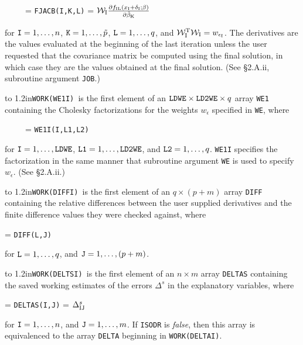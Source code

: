 
\aligntobox \ \ \ \ \ = {\tt FJACB(I,K,L)} = ${\cal W}_{\rm I}{{\partial
f_{\rm IL}(x_{\rm I}+\delta_{\rm
I};\beta)}\over{\partial\tilde{\beta}_{\rm K}}}$ 

\aligntobox for ${\tt I} = 1,\ldots,n$, ${\tt K} = 1,\ldots,\tilde{p}$, ${\tt L} = 1,\ldots,q$, and ${\cal W}_{\rm I}^{\rm T}{\cal W}_{\rm I} =
w_{\epsilon_{\rm I}}$. The derivatives are the values evaluated at the beginning of the last iteration unless the user requested that the covariance matrix be computed using the final solution, in which case they are the values obtained at the final solution. (See \S 2.A.ii, subroutine argument {\tt JOB}.)
\bigskip

\hangindent\wd\mybox{}\noindent\hbox to
1.2in{\hfill\tt WORK(WE1I) }is the first element of an ${\tt LDWE}\times {\tt LD2WE}\times q$ array {\tt WE1} containing the Cholesky factorizations for the weights $w_\epsilon$ specified in {\tt WE}, where


\aligntobox\ \ \ \ \ = {\tt WE1I(I,L1,L2)}

\aligntobox for ${\tt I} = 1,\ldots,{\tt LDWE}$, ${\tt L1} = 1,\ldots,{\tt LD2WE}$, and ${\tt L2} = 1,\ldots,q$. {\tt WE1I} specifies the factorization in the same manner that subroutine argument {\tt WE} is used to specify $w_\epsilon$. (See \S 2.A.ii.)
\bigskip

\hangindent\wd\mybox{}\noindent\hbox to
1.2in{\hfill\tt WORK(DIFFI) }is the first element of an $q \times (p + m)$ array {\tt DIFF} containing the relative differences between the user supplied derivatives and the finite difference values they were checked against, where

 = {\tt DIFF(L,J)}

\aligntobox for ${\tt L} = 1,\ldots,q$, and ${\tt J} = 1,\ldots,(p + m)$. 
\bigskip

\hangindent\wd\mybox{}\noindent\hbox to
1.2in{\hfill\tt WORK(DELTSI) }is the first element of an $n \times m$ array {\tt DELTAS} containing the saved working estimates of the errors $\Delta^s$ in the explanatory variables, where

 = {\tt DELTAS(I,J)} = $\Delta^s_{\rm
IJ}$ 

\aligntobox for ${\tt I} = 1,\ldots,n$, and ${\tt J} = 1,\ldots,m$. If {\tt ISODR} is {\it false\/}, then this array is equivalenced to the array {\tt DELTA} beginning in {\tt WORK(DELTAI)}.
\bigskip

